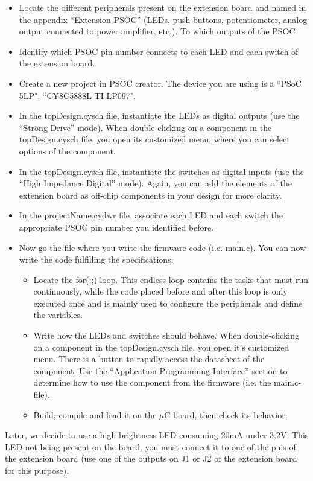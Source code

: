 \documentclass[11pt,a4paper]{article}
\theoremstyle{definition}%
\begin{document}
\begin{itemize}
	\item Locate the different peripherals present on the extension board and named in the appendix ``Extension PSOC'' (LEDs, push-buttons, potentiometer, analog output connected to power amplifier, etc.). To which outputs of the PSOC 
	\item Identify which PSOC pin number connects to each LED and each switch of the extension board. 
	\item Create a new project in PSOC creator. The device you are using is a ``PSoC 5LP", ``CY8C5888L TI-LP097".
	\item In the topDesign.cysch file, instantiate the LEDs as digital outputs (use the ``Strong Drive'' mode). When double-clicking on a component in the topDesign.cysch file, you open its customized menu, where you can select options of the component.
	\item In the topDesign.cysch file, instantiate the switches as digital inputs (use the ``High Impedance Digital'' mode). Again, you can add the elements of the extension board as off-chip components in your design for more clarity. 
	\item In the projectName.cydwr file, associate each LED and each switch the appropriate PSOC pin number you identified before. 
	
	\item Now go the file where you write the firmware code (i.e. main.c). You can now write the code fulfilling the specifications: 
	\begin{itemize}
		\item Locate the for(;;) loop.
        This endless loop contains the tasks that must run continuously, while the code placed before and after this loop is only executed once and is mainly used to configure the peripherals and define the variables.
		\item Write how the LEDs and switches should behave. When double-clicking on a component in the topDesign.cysch file, you open it's customized menu. There is a button to rapidly access the datasheet of the component. Use the ``Application Programming Interface'' section to determine how to use the component from the firmware (i.e. the main.c-file). 
		\item Build, compile and load it on the $\mu$C board, then check its behavior.
	\end{itemize}
\end{itemize}

Later, we decide to use a high brightness LED consuming 20mA under 3,2V.
This LED not being present on the board, you must connect it to one of the pins of the extension board (use one of the outputs on J1 or J2 of the extension board for this purpose).
\end{document}
